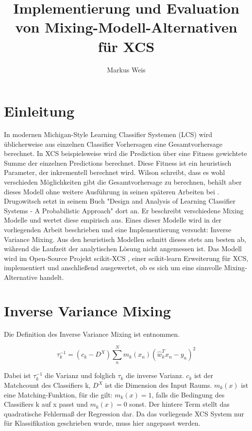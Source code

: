 \documentclass[10pt]{ocsmnar}
\begin{document}
\title{Implementierung und Evaluation von Mixing-Modell-Alternativen für XCS}


\author{Markus Weis}

\maketitle




\section{Einleitung}
In modernen Michigan-Style Learning Classifier Systemen (LCS) wird üblicherweise aus einzelnen Classifier Vorhersagen eine Gesamtvorhersage berechnet. In XCS beispielsweise wird  die Prediction über eine Fitness gewichtete Summe der einzelnen Predictions berechnet. Diese Fitness ist ein heuristisch Parameter, der inkrementell berechnet wird. Wilson schreibt, dass es wohl verschieden Möglichkeiten gibt die Gesamtvorhersage zu berechnen, behält aber dieses Modell ohne weitere Ausführung in seinen späteren Arbeiten bei \cite{Wilson95}. 
Drugowitsch setzt in seinem Buch "Design and Analysis of Learning Classifier Systems - A Probabilistic Approach" \cite{book} dort an. Er beschreibt verschiedene Mixing Modelle und wertet diese empirisch aus. 
Eines dieser Modelle wird in der vorliegenden Arbeit beschrieben und eine Implementierung versucht: Inverse Variance Mixing. Aus den heuristisch Modellen schnitt dieses stets am besten ab, während die Laufzeit der  analytischen Lösung nicht angemessen ist. Das Modell wird im Open-Source Projekt scikit-XCS \cite{repo}, einer scikit-learn Erweiterung für XCS, implementiert und anschließend ausgewertet, ob es sich um eine sinnvolle Mixing-Alternative handelt.

\section{Inverse Variance Mixing}
Die Definition des Inverse Variance Mixing ist \cite{book} entnommen. 

$$ \tau_{k}^{-1} = (c_{k} - D^{X}) \sum_{n}^{N} m_{k}(x_{n}) (\hat{w}_{k}^T x_{n} - y_{n})^{2}$$

Dabei ist $\tau_{k}^{-1}$ die Varianz und folglich $\tau_{k}$ die inverse Varianz. $c_{k}$ ist der Matchcount des Classifiers k, $D^{X}$ ist die Dimension des Input Raums. $m_{k}(x)$ ist eine Matching-Funktion, für die gilt: $m_{k}(x) = 1$, falls die Bedingung des Classifiers k auf x passt und $m_{k}(x) = 0$ sonst. 
Der hintere Term stellt das quadratische Fehlermaß der Regression dar. Da das vorliegende XCS System nur für Klassifikation geschrieben wurde, muss hier angepasst werden.
\end{document}
